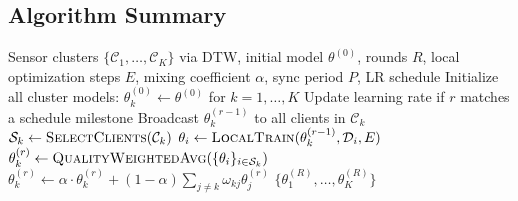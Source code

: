 \subsection{Algorithm Summary}

\begin{algorithm}[H]
\caption{Hierarchical Federated Learning for Traffic Prediction}
\label{alg:hfl}
\begin{algorithmic}[1]
\REQUIRE Sensor clusters $\{\mathcal{C}_1, \dots, \mathcal{C}_K\}$ via DTW, initial model $\theta^{(0)}$, rounds $R$, local optimization steps $E$, mixing coefficient $\alpha$, sync period $P$, LR schedule
\STATE Initialize all cluster models: $\theta_k^{(0)} \leftarrow \theta^{(0)}$ for $k = 1, \dots, K$
    \STATE Update learning rate if $r$ matches a schedule milestone
        \STATE Broadcast $\theta_k^{(r-1)}$ to all clients in $\mathcal{C}_k$
        \STATE $\mathcal{S}_k \leftarrow \textsc{SelectClients}(\mathcal{C}_k)$ 
            \STATE $\theta_i \leftarrow \textsc{LocalTrain}(\theta_k^{(r-1)}, \mathcal{D}_i, E)$
        \ENDFOR
        \STATE $\theta_k^{(r)} \leftarrow \textsc{QualityWeightedAvg}(\{\theta_i\}_{i \in \mathcal{S}_k})$ 
    \ENDFOR
            \STATE $\theta_k^{(r)} \leftarrow \alpha \cdot \theta_k^{(r)} + (1 - \alpha) \sum_{j \neq k} \omega_{kj} \theta_j^{(r)}$ 
        \ENDFOR
    \ENDIF
\ENDFOR
\RETURN $\{\theta_1^{(R)}, \dots, \theta_K^{(R)}\}$
\end{algorithmic}
\end{algorithm}





